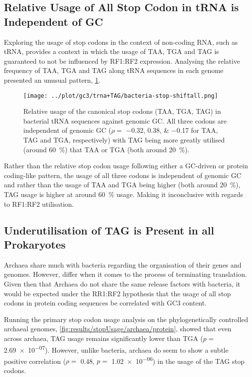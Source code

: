 \documentclass[../main.tex]{subfile}
\begin{document}
    \subsection{Relative Usage of All Stop Codon in tRNA is Independent of GC}
        Exploring the usage of stop codons in the context of non-coding RNA, such as tRNA, provides a context in which the usage of TAA, TGA and TAG is guaranteed to not be influenced by RF1:RF2 expression. Analysing the relative frequency of TAA, TGA and TAG along tRNA sequences in each genome presented an unusual pattern, \cref{fig:results/bacteria/tRNA}.

        \begin{figure}[H]
            \centering
            \texttt{[image: ../plot/gc3/trna+TAG/bacteria-stop-shiftall.png]}
            \caption{%
                Relative usage of the canonical stop codons (TAA, TGA, TAG) in bacterial tRNA sequences against genomic GC. All three codons are independent of genomic GC ($\rho =$ \numlist{-0.32;0.38;-0.17} for TAA, TAG and TGA, respectively) with TAG being more greatly utilised (around \SI{60}{\percent}) that TAA or TGA (both around \SI{20}{\percent}).
            }
            \label{fig:results/bacteria/tRNA}
        \end{figure}

        Rather than the relative stop codon usage following either a GC-driven or protein coding-like pattern, the usage of all three codons is independent of genomic GC and rather than the usage of TAA and TGA being higher (both around \SI{20}{\percent}), TAG usage is higher at around \SI{60}{\percent} usage. Making it inconclusive with regards to RF1:RF2 utilisation.

    \subsection{Underutilisation of TAG is Present in all Prokaryotes}
        Archaea share much with bacteria regarding the organisation of their genes and genomes. However, differ when it comes to the process of terminating translation.  Given then that Archaea do not share the same release factors with bacteria, it would be expected under the RR1:RF2 hypothesis that the usage of all stop codons in protein coding sequences be correlated with GC3 content.

        Running the primary stop codon usage analysis on the phylogenetically controlled archaeal genomes, \cref{fig:results/stopUsage/archaea/protein}, showed that even across archaea, TAG usage remains significantly lower than TGA ($p=$ \num{2.69e-07}). However, unlike bacteria, archaea do seem to show a subtle positive correlation ($\rho=$ \num{0.48}, $p=$ \num{1.02e-06}) in the usage of the TAG stop codons.
\end{document}
